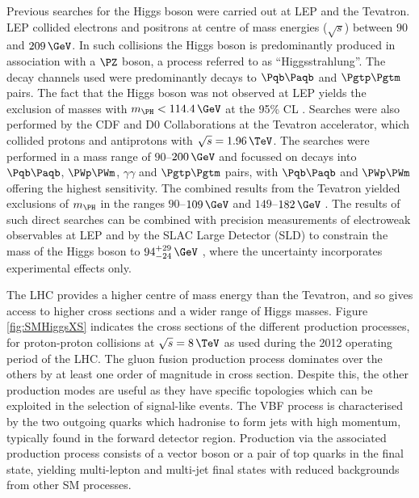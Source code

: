 Previous searches for the Higgs boson were carried out at LEP and the
Tevatron. LEP collided electrons and positrons at centre of mass
energies ($\sqrt{s}$) between $90$ and $209\,\GeV$. In such collisions the Higgs
boson is predominantly produced in association with a $\PZ$ boson, a process
referred to as ``Higgsstrahlung''. The decay channels used were predominantly decays
to $\Pqb\Paqb$ and $\Pgtp\Pgtm$ pairs. The fact that the Higgs boson was not
observed at LEP yields the exclusion of masses with $m_{\PH}<114.4\,\GeV$ at the
95\% \ac{CL} \cite{Barate:2003sz}. Searches were also performed by the CDF and D0 Collaborations at
the Tevatron accelerator, which collided protons and antiprotons with
$\sqrt{s}=1.96\,\TeV$. The searches were performed in a mass range of
$90$--$200\,\GeV$ and focussed on decays into $\Pqb\Paqb$, $\PWp\PWm$,
$\gamma\gamma$ and $\Pgtp\Pgtm$ pairs, with  $\Pqb\Paqb$ and $\PWp\PWm$ offering
the highest sensitivity. The combined results from the Tevatron yielded
exclusions of $m_{\PH}$ in the ranges $90$--$109\,\GeV$ and $149$--$182\,\GeV$
\cite{Aaltonen:2013kxa}. The results of such direct searches
can be combined with precision measurements of electroweak observables at LEP
and by the SLAC Large Detector (SLD) to constrain the mass of the Higgs
boson to $94^{+29}_{-24}\,\GeV$ \cite{lepewwg}, 
where the uncertainty incorporates experimental effects only.

The LHC provides a higher centre of mass energy than the Tevatron, and so
gives access to higher cross sections and a wider range of Higgs masses. Figure
\ref{fig:SMHiggsXS} indicates the cross sections of the different production
processes, for proton-proton collisions at $\sqrt{s}=8\,\TeV$ as used during the 
2012 operating period of the LHC. The gluon fusion production process dominates 
over the others by at least one order of magnitude in cross section. 
Despite this, the other production modes are useful as they have specific 
topologies which can be exploited in the selection of signal-like events. 
The \ac{VBF} process is characterised by the two outgoing quarks which
hadronise to form jets with high momentum, typically found in the forward
detector region. Production via the associated production process consists of a vector
boson or a pair of top quarks in the final state, yielding multi-lepton and 
multi-jet final states with reduced backgrounds from other \ac{SM} processes.

